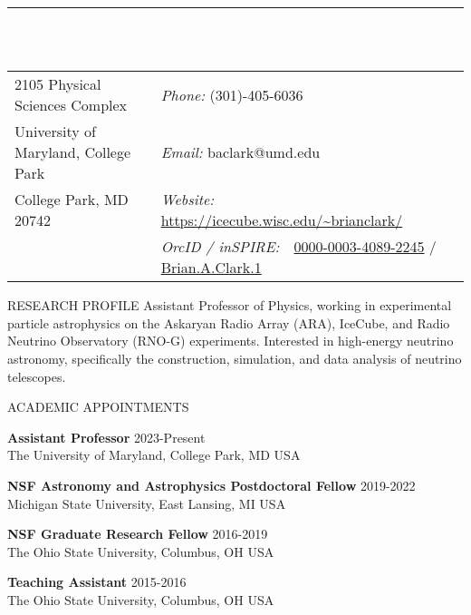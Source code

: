 \documentclass{resume} %
\begin{document}

\vspace{-1cm}
\rule{\textwidth}{0.1cm} \\ \\
\begin{tabular}{@{}p{2.5in}p{4in}}
2105 Physical Sciences Complex            & {\it Phone:}  (301)-405-6036 \\            
University of Maryland, College Park  & {\it Email:}  baclark@umd.edu
 \\         
College Park, MD 20742   & {\it Website:} \url{https://icecube.wisc.edu/~brianclark/} \\       
   & {\it OrcID / inSPIRE:} \,\,      \href{https://orcid.org/0000-0003-4089-2245}{0000-0003-4089-2245}  / \href{https://inspirehep.net/author/profile/Brian.A.Clark.1}{Brian.A.Clark.1}\\     
\end{tabular}


\begin{rSection}{RESEARCH PROFILE}
Assistant Professor of Physics, working in experimental particle astrophysics on the Askaryan Radio Array (ARA), IceCube, and Radio Neutrino Observatory (RNO-G) experiments. Interested in high-energy neutrino astronomy, specifically the construction, simulation, and data analysis of neutrino telescopes.
\end{rSection}
\vspace{-0.1cm}



\begin{rSection}{ACADEMIC APPOINTMENTS}

\textbf{Assistant Professor} \hfill 2023-Present \\ The University of Maryland, College Park, MD USA 

\textbf{NSF Astronomy and Astrophysics Postdoctoral Fellow} \hfill 2019-2022 \\ Michigan State University, East Lansing, MI USA 

\textbf{NSF Graduate Research Fellow} \hfill 2016-2019 \\ The Ohio State University, Columbus, OH USA 

\textbf{Teaching Assistant} \hfill 2015-2016 \\ The Ohio State University, Columbus, OH USA 


\end{rSection}
\end{document}
